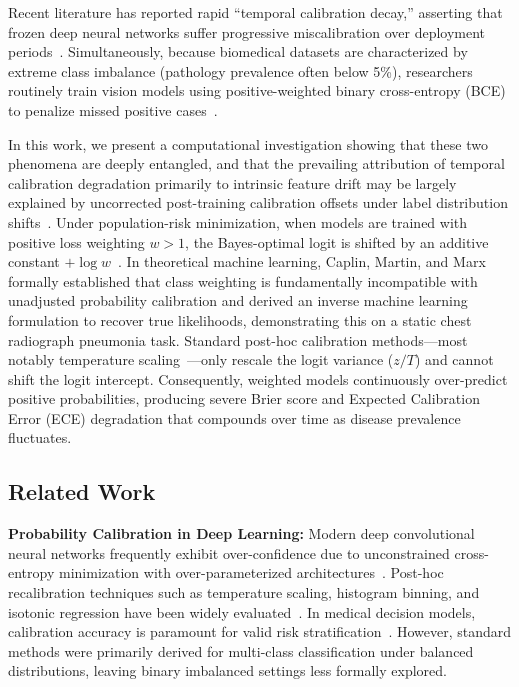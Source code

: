 \documentclass[preprint,12pt]{elsarticle}
\begin{document}
Recent literature has reported rapid ``temporal calibration decay,'' asserting that frozen deep neural networks suffer progressive miscalibration over deployment periods~\cite{guo2022evaluation, hinson2022multisite}. Simultaneously, because biomedical datasets are characterized by extreme class imbalance (pathology prevalence often below 5\%), researchers routinely train vision models using positive-weighted binary cross-entropy (BCE) to penalize missed positive cases~\cite{rajpurkar2017chexnet, buda2018systematic}. 

In this work, we present a computational investigation showing that these two phenomena are deeply entangled, and that the prevailing attribution of temporal calibration degradation primarily to intrinsic feature drift may be largely explained by uncorrected post-training calibration offsets under label distribution shifts~\cite{alexandari2020maximum, davis2020detection}. Under population-risk minimization, when models are trained with positive loss weighting $w > 1$, the Bayes-optimal logit is shifted by an additive constant $+\log w$~\cite{king2001logistic, caplin2022calibrating}. In theoretical machine learning, Caplin, Martin, and Marx~\cite{caplin2022calibrating} formally established that class weighting is fundamentally incompatible with unadjusted probability calibration and derived an inverse machine learning formulation to recover true likelihoods, demonstrating this on a static chest radiograph pneumonia task. Standard post-hoc calibration methods---most notably temperature scaling~\cite{guo2017calibration}---only rescale the logit variance ($z / T$) and cannot shift the logit intercept. Consequently, weighted models continuously over-predict positive probabilities, producing severe Brier score and Expected Calibration Error (ECE) degradation that compounds over time as disease prevalence fluctuates.

\subsection{Related Work}
\textbf{Probability Calibration in Deep Learning:} Modern deep convolutional neural networks frequently exhibit over-confidence due to unconstrained cross-entropy minimization with over-parameterized architectures~\cite{guo2017calibration}. Post-hoc recalibration techniques such as temperature scaling, histogram binning, and isotonic regression have been widely evaluated~\cite{guo2017calibration, platt1999probabilistic}. In medical decision models, calibration accuracy is paramount for valid risk stratification~\cite{vancalster2019calibration, steyerberg2010assessing}. However, standard methods were primarily derived for multi-class classification under balanced distributions, leaving binary imbalanced settings less formally explored.
\end{document}
